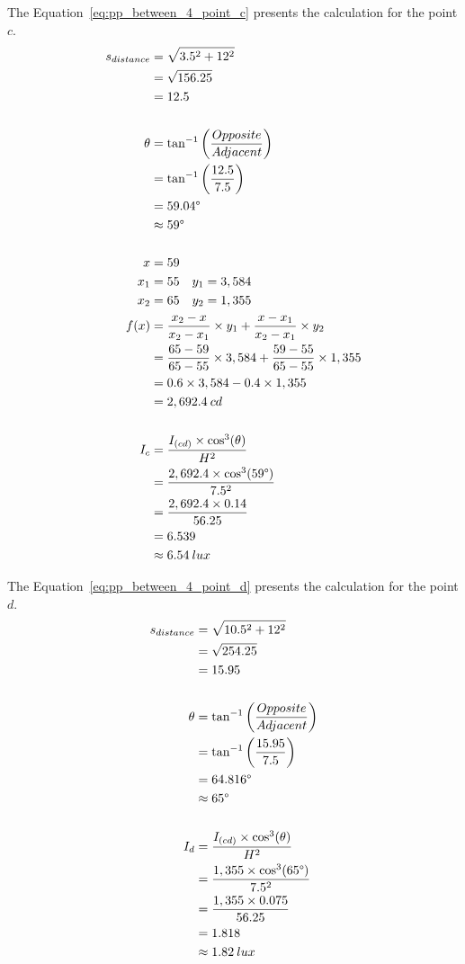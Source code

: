 The Equation~\ref{eq:pp_between_4_point_c} presents the calculation for the point $c$.
\begin{equation}
\begin{split}
s_{distance} & = \sqrt{3.5^2 + 12^2} \\
 & = \sqrt{156.25} \\
 & = 12.5 \\
\\
\theta &= \tan^{-1}\left( \frac{Opposite}{Adjacent} \right) \\
 & = \tan^{-1}\left( \frac{12.5}{7.5} \right) \\
 & = 59.04\degree \\
 & \approx 59\degree\\
\\
x & = 59 \\
x_1 & = 55 \quad y_1 = 3,584 \\
x_2 & = 65 \quad y_2 = 1,355 \\
f(x) &= \frac{x_2 - x}{x_2 - x_1} \times y_1 +
       \frac{x - x_1}{x_2 - x_1} \times y_2 \\
 &= \frac{65 - 59}{65 - 55} \times 3,584 +
    \frac{59 - 55}{65 - 55} \times 1,355 \\
 & = 0.6 \times 3,584 - 0.4 \times 1,355 \\
 & = 2,692.4\: cd \\
\\
I_c &= \frac{I_{(cd)} \times \cos^3(\theta)}{H^2} \\
 &= \frac{2,692.4 \times \cos^3(59\degree)}{7.5^2} \\
 &= \frac{2,692.4 \times 0.14}{56.25} \\
 & = 6.539 \\
 & \approx 6.54\: lux
\end{split}
\label{eq:pp_between_4_point_c}
\end{equation}

The Equation~\ref{eq:pp_between_4_point_d} presents the calculation for the point $d$.
\begin{equation}
\begin{split}
s_{distance} & = \sqrt{10.5^2 + 12^2} \\
 & = \sqrt{254.25} \\
 & = 15.95 \\
\\
\theta &= \tan^{-1}\left( \frac{Opposite}{Adjacent} \right) \\
 & = \tan^{-1}\left( \frac{15.95}{7.5} \right) \\
 & = 64.816\degree \\
 & \approx 65\degree\\
\\
I_d &= \frac{I_{(cd)} \times \cos^3(\theta)}{H^2} \\
 &= \frac{1,355 \times \cos^3(65\degree)}{7.5^2} \\
 &= \frac{1,355 \times 0.075}{56.25} \\
 & = 1.818 \\
 & \approx 1.82\: lux
\end{split}
\label{eq:pp_between_4_point_d}
\end{equation}

